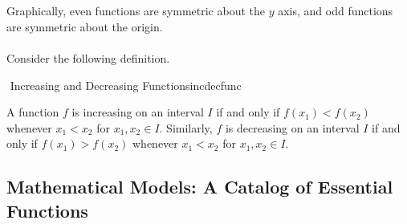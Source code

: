 		\vphantom
		\\
		\\
		Graphically, even functions are symmetric about the \(y\) axis, and odd functions are symmetric about the origin.
		\pagebreak
		\vphantom
		\\
		\\
		Consider the following definition.
		\begin{definition}{\Stop\,\,Increasing and Decreasing Functions}{incdecfunc}

			A function \(f\) is increasing on an interval \(I\) if and only if \(f(x_1)<f(x_2)\) whenever \(x_1<x_2\) for \(x_1,x_2\in I\). Similarly, \(f\) is decreasing on an interval \(I\) if and only if \(f(x_1)>f(x_2)\) whenever \(x_1<x_2\) for \(x_1,x_2\in I\).
			
		\end{definition}

	\pagebreak

	\subsection{Mathematical Models: A Catalog of Essential Functions}

